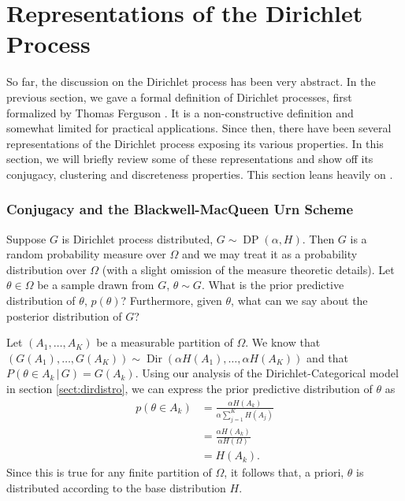 \documentclass[final,3p,times,twocolumn]{elsarticle}
\DeclareMathOperator*{\Dir}{Dir}
\DeclareMathOperator*{\DP}{DP}
\begin{document}
\section{Representations of the Dirichlet Process}
\label{sect:representations}
So far, the discussion on the Dirichlet process has been very abstract.
In the previous section, we gave a formal definition of Dirichlet processes, first formalized by Thomas Ferguson \cite{ferguson1973}.
It is a non-constructive definition and somewhat limited for practical applications.
Since then, there have been several representations of the Dirichlet process exposing its various properties.
In this section, we will briefly review some of these representations and show off its conjugacy, clustering and discreteness properties.
This section leans heavily on \cite{Teh2010a}.

\subsubsection*{\normalfont \small \bfseries Conjugacy and the Blackwell-MacQueen Urn Scheme}
Suppose $G$ is Dirichlet process distributed, $G \sim \DP(\alpha,H)$.
Then $G$ is a random probability measure over $\Omega$ and we may treat it as a probability distribution over $\Omega$ (with a slight omission of the measure theoretic details).
Let $\theta \in \Omega$ be a sample drawn from $G$, $\theta \sim G$.
What is the prior predictive distribution of $\theta$, $p(\theta)$? Furthermore, given $\theta$, what can we say about the posterior distribution of $G$?

Let $(A_1,\dots,A_K)$ be a measurable partition of $\Omega$. 
We know that $(G(A_1),\dots,G(A_K))\sim \Dir(\alpha H(A_1),\dots,\alpha H(A_K))$ and that $P(\theta \in A_k \,|\, G) = G(A_k)$.
Using our analysis of the Dirichlet-Categorical model in section \ref{sect:dirdistro}, we can express the prior predictive distribution of $\theta$ as
\begin{equation}
\label{eqn:dppriorpredictive}
\begin{split}
p(\theta \in A_k) &= \frac{\alpha H(A_k)}{\alpha \sum_{j=1}^K H(A_j)}\\
&= \frac{\alpha H(A_k)}{\alpha H(\Omega)}\\
&= H(A_k).
\end{split}
\end{equation}
Since this is true for any finite partition of $\Omega$, it follows that, a priori, $\theta$ is distributed according to the base distribution $H$.
\end{document}
